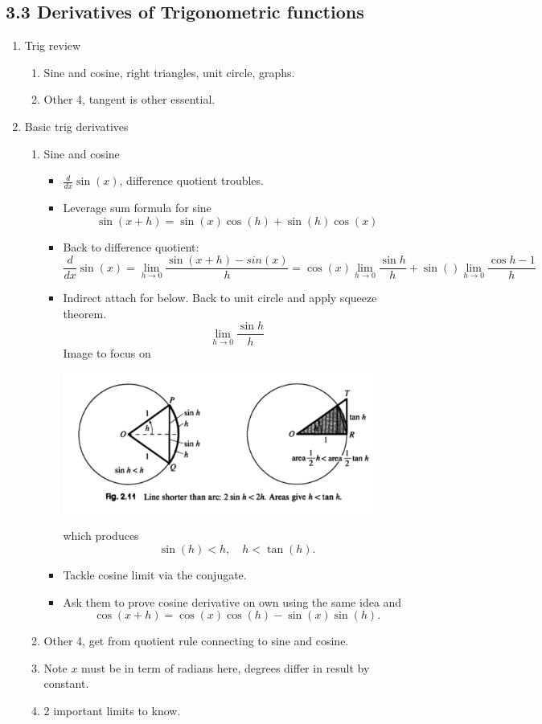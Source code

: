 \documentclass{article}
\begin{document}
\subsection{3.3 Derivatives of Trigonometric functions}
\begin{enumerate}


\item Trig review
\begin{enumerate}
\item Sine and cosine, right triangles, unit circle, graphs.
\item Other 4, tangent is other essential.
\end{enumerate}

\item Basic trig derivatives
\begin{enumerate}
\item Sine and cosine
\begin{itemize}
\item $\frac{d}{dx} \sin(x)$, difference quotient troubles.
\item Leverage sum formula for sine
\[
\sin(x+h) = \sin(x)\cos(h) + \sin(h)\cos(x)
\]
\item Back to difference quotient:
\[
\frac{d}{dx}\sin(x) = \lim_{h\rightarrow 0} \frac{\sin(x+h)-sin(x)}{h}
= \cos(x)\lim_{h\rightarrow 0}\frac{\sin h}{h}+\sin ()\lim_{h\rightarrow 0}\frac{\cos h-1}{h}
\]
\item Indirect attach for below. Back to unit circle and apply squeeze theorem.
\[
\lim_{h\rightarrow 0}\frac{\sin h}{h}
\]
Image to focus on
\begin{center}
\includegraphics[width=0.9\textwidth]{33pic.png}
\end{center}
which produces
\[
\sin(h) < h, \quad h < \tan(h).
\]
\item Tackle cosine limit via the conjugate.
\item Ask them to prove cosine derivative on own using the same idea and 
\[
\cos(x+h) = \cos(x)\cos(h) - \sin(x)\sin(h).
\]
\end{itemize}
\item Other 4, get from quotient rule connecting to sine and cosine.
\item Note $x$ must be in term of radians here, degrees differ in result by constant.
\item 2 important limits to know.
\end{enumerate}



\end{enumerate}
\end{document}
